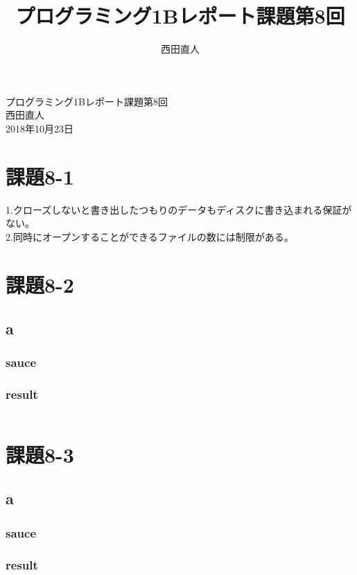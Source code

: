 \documentclass[10pt,a4paper]{jsarticle}
\title{プログラミング1Bレポート課題第8回}
\author{西田直人}
\begin{document}
\begin{center}
{\LARGE プログラミング1Bレポート課題第8回} \\
\large
西田直人 \\ 2018年10月23日
\end{center}
\normalsize
\section{課題8-1}
\noindent 1.クローズしないと書き出したつもりのデータもディスクに書き込まれる保証がない。\\
2.同時にオープンすることができるファイルの数には制限がある。
\section{課題8-2}
\subsection{a}
\subsubsection{sauce}


\subsubsection{result}
\begin{lstlisting}

\end{lstlisting}

\section{課題8-3}
\subsection{a}
\subsubsection{sauce}


\subsubsection{result}
\end{document}
